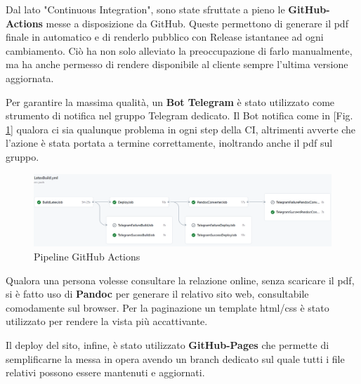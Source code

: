         Dal lato "Continuous Integration", sono state sfruttate a pieno le \textbf{GitHub-Actions} messe a disposizione da GitHub. Queste permettono di generare il pdf finale in automatico e di renderlo pubblico con Release istantanee ad ogni cambiamento. Ciò ha non solo alleviato la preoccupazione di farlo manualmente, ma ha anche permesso di rendere disponibile al cliente sempre l'ultima versione aggiornata. 

        Per garantire la massima qualità, un \textbf{Bot Telegram} è stato utilizzato come strumento di notifica nel gruppo Telegram dedicato. Il Bot notifica come in [Fig. \ref{fig:ci-github}] qualora ci sia qualunque problema in ogni step della CI, altrimenti avverte che l'azione è stata portata a termine correttamente, inoltrando anche il pdf sul gruppo. 

        \begin{figure}[H]
            \caption{Pipeline GitHub Actions}
            \label{fig:ci-github}
            \centering
            \includegraphics[width=1\textwidth]{Images/gh-pipeline.png}
        \end{figure}

        Qualora una persona volesse consultare la relazione online, senza scaricare il pdf, si è fatto uso di \textbf{Pandoc} per generare il relativo sito web, consultabile comodamente sul browser. Per la paginazione un template html/css è stato utilizzato per rendere la vista più accattivante.

        Il deploy del sito, infine, è stato utilizzato \textbf{GitHub-Pages} che permette di semplificarne la messa in opera avendo un branch dedicato sul quale tutti i file relativi possono essere mantenuti e aggiornati.
        

